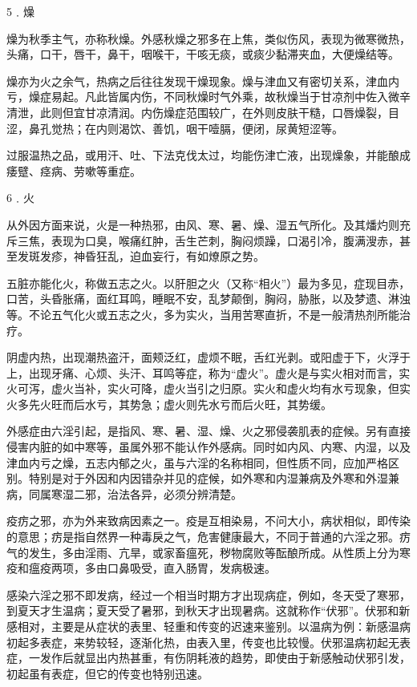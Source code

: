 \documentclass[12pt,UTF8]{ctexbook}
\begin{document}
5﹒燥

燥为秋季主气，亦称秋燥。外感秋燥之邪多在上焦，类似伤风，表现为微寒微热，头痛，口干，唇干，鼻干，咽喉干，干咳无痰，或痰少黏滞夹血，大便燥结等。

燥亦为火之余气，热病之后往往发现干燥现象。燥与津血又有密切关系，津血内亏，燥症易起。凡此皆属内伤，不同秋燥时气外乘，故秋燥当于甘凉剂中佐入微辛清泄，此则但宜甘凉清润。内伤燥症范围较广，在外则皮肤干糙，口唇燥裂，目涩，鼻孔觉热；在内则渴饮、善饥，咽干噎膈，便闭，尿黄短涩等。

过服温热之品，或用汗、吐、下法克伐太过，均能伤津亡液，出现燥象，并能酿成痿躄、痉病、劳嗽等重症。

6﹒火

从外因方面来说，火是一种热邪，由风、寒、暑、燥、湿五气所化。及其燔灼则充斥三焦，表现为口臭，喉痛红肿，舌生芒刺，胸闷烦躁，口渴引冷，腹满溲赤，甚至发斑发疹，神昏狂乱，迫血妄行，有如燎原之势。

五脏亦能化火，称做五志之火。以肝胆之火（又称“相火”）最为多见，症现目赤，口苦，头昏胀痛，面红耳鸣，睡眠不安，乱梦颠倒，胸闷，胁胀，以及梦遗、淋浊等。不论五气化火或五志之火，多为实火，当用苦寒直折，不是一般清热剂所能治疗。

阴虚内热，出现潮热盗汗，面颊泛红，虚烦不眠，舌红光剥。或阳虚于下，火浮于上，出现牙痛、心烦、头汗、耳鸣等症，称为“虚火”。虚火是与实火相对而言，实火可泻，虚火当补，实火可降，虚火当引之归原。实火和虚火均有水亏现象，但实火多先火旺而后水亏，其势急；虚火则先水亏而后火旺，其势缓。

外感症由六淫引起，是指风、寒、暑、湿、燥、火之邪侵袭肌表的症候。另有直接侵害内脏的如中寒等，虽属外邪不能认作外感病。同时如内风、内寒、内湿，以及津血内亏之燥，五志内郁之火，虽与六淫的名称相同，但性质不同，应加严格区别。特别是对于外因和内因错杂并见的症候，如外寒和内湿兼病及外寒和外湿兼病，同属寒湿二邪，治法各异，必须分辨清楚。

疫疠之邪，亦为外来致病因素之一。疫是互相染易，不问大小，病状相似，即传染的意思；疠是指自然界一种毒戾之气，危害健康最大，不同于普通的六淫之邪。疠气的发生，多由淫雨、亢旱，或家畜瘟死，秽物腐败等酝酿所成。从性质上分为寒疫和瘟疫两项，多由口鼻吸受，直入肠胃，发病极速。

感染六淫之邪不即发病，经过一个相当时期方才出现病症，例如，冬天受了寒邪，到夏天才生温病；夏天受了暑邪，到秋天才出现暑病。这就称作“伏邪”。伏邪和新感相对，主要是从症状的表里、轻重和传变的迟速来鉴别。以温病为例：新感温病初起多表症，来势较轻，逐渐化热，由表入里，传变也比较慢。伏邪温病初起无表症，一发作后就显出内热甚重，有伤阴耗液的趋势，即使由于新感触动伏邪引发，初起虽有表症，但它的传变也特别迅速。
\end{document}
